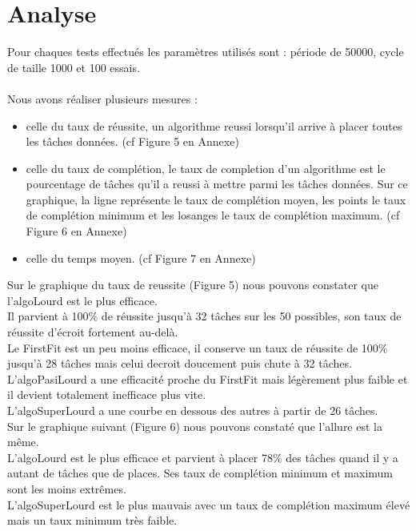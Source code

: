 \documentclass[11pt]{article}
\begin{document}
\section{Analyse}
Pour chaques tests effectués les paramètres utilisés sont : période de 50000, cycle de taille 1000 et 100 essais.\\
\\
Nous avons réaliser plusieurs mesures :
\begin{itemize}
    \item celle du taux de réussite, un algorithme reussi lorsqu'il arrive à placer toutes les tâches données. (cf Figure 5 en Annexe)
    \item celle du taux de complétion, le taux de completion d'un algorithme est le pourcentage de tâches qu'il a reussi à mettre parmi les tâches données. Sur ce graphique, la ligne représente le taux de complétion moyen, les points le taux de complétion minimum et les losanges le taux de complétion maximum. (cf Figure 6 en Annexe)
    \item celle du temps moyen. (cf Figure 7 en Annexe)\\
\end{itemize}

 Sur le graphique du taux de reussite (Figure 5) nous pouvons constater que l'algoLourd est le plus efficace.\\
 Il parvient à 100\% de réussite jusqu'à 32 tâches sur les 50 possibles, son taux de réussite d'écroit fortement au-delà.\\
 Le FirstFit est un peu moins efficace, il conserve un taux de réussite de 100\% jusqu'à 28 tâches mais celui decroit doucement puis chute à 32 tâches.\\
 L'algoPasiLourd a une efficacité proche du FirstFit mais légèrement plus faible et il devient totalement inefficace plus vite.\\
 L'algoSuperLourd a une courbe en dessous des autres à partir de 26 tâches.\\

 Sur le graphique suivant (Figure 6) nous pouvons constaté que l'allure est la même.\\
L'algoLourd est le plus efficace et parvient à placer 78\% des tâches quand il y a autant de tâches que de places. Ses taux de complétion minimum et maximum sont les moins extrêmes.\\ 
L'algoSuperLourd est le plus mauvais avec un taux de complétion maximum élevé mais un taux minimum très faible.\\
\end{document}
